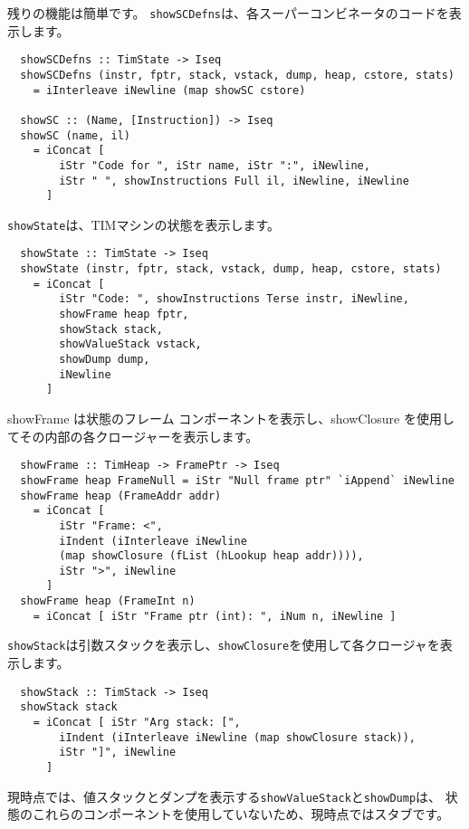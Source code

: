 \documentclass{jarticle}
\begin{document}
残りの機能は簡単です。
\texttt{showSCDefns}は、各スーパーコンビネータのコードを表示します。

\begin{verbatim}
  showSCDefns :: TimState -> Iseq
  showSCDefns (instr, fptr, stack, vstack, dump, heap, cstore, stats)
    = iInterleave iNewline (map showSC cstore)

  showSC :: (Name, [Instruction]) -> Iseq
  showSC (name, il)
    = iConcat [
        iStr "Code for ", iStr name, iStr ":", iNewline,
        iStr " ", showInstructions Full il, iNewline, iNewline
      ]
\end{verbatim}

\texttt{showState}は、TIMマシンの状態を表示します。

\begin{verbatim}
  showState :: TimState -> Iseq
  showState (instr, fptr, stack, vstack, dump, heap, cstore, stats)
    = iConcat [
        iStr "Code: ", showInstructions Terse instr, iNewline,
        showFrame heap fptr,
        showStack stack,
        showValueStack vstack,
        showDump dump,
        iNewline
      ]
\end{verbatim}

showFrame は状態のフレーム コンポーネントを表示し、showClosure を使用してその内部の各クロージャーを表示します。

\begin{verbatim}
  showFrame :: TimHeap -> FramePtr -> Iseq
  showFrame heap FrameNull = iStr "Null frame ptr" `iAppend` iNewline
  showFrame heap (FrameAddr addr)
    = iConcat [
        iStr "Frame: <",
        iIndent (iInterleave iNewline
        (map showClosure (fList (hLookup heap addr)))),
        iStr ">", iNewline
      ]
  showFrame heap (FrameInt n)
    = iConcat [ iStr "Frame ptr (int): ", iNum n, iNewline ]
\end{verbatim}

\texttt{showStack}は引数スタックを表示し、\texttt{showClosure}を使用して各クロージャを表示します。

\begin{verbatim}
  showStack :: TimStack -> Iseq
  showStack stack
    = iConcat [ iStr "Arg stack: [",
        iIndent (iInterleave iNewline (map showClosure stack)),
        iStr "]", iNewline
      ]
\end{verbatim}

現時点では、値スタックとダンプを表示する\texttt{showValueStack}と\texttt{showDump}は、
状態のこれらのコンポーネントを使用していないため、現時点ではスタブです。
\end{document}
